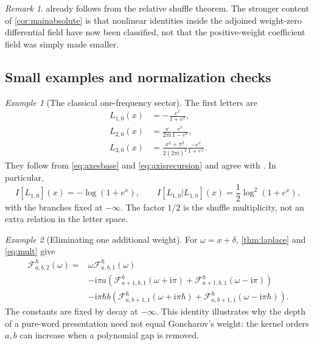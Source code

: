 \documentclass[11pt]{article}
\numberwithin{equation}{section}
\theoremstyle{definition}
\theoremstyle{remark}
\newtheorem{remark}[remark]{Remark}
\newtheorem{example}[example]{Example}
\newcommand{\ii}{\mathrm i}
\newcommand{\calF}{\mathcal F}
\newcommand{\qh}{\hbar}
\begin{document}
\begin{remark}
 already follows from the relative shuffle theorem.
The stronger content of \cref{cor:mainabsolute} is that nonlinear identities
inside the adjoined weight-zero differential field have now been classified,
not that the positive-weight coefficient field was simply made smaller.
\end{remark}

\subsection{Small examples and normalization checks}

\begin{example}[The classical one-frequency sector]
The first letters are
\begin{equation}\label{eq:classicalexamples}
 \begin{split}
 L_{1,0}(x)&=-\frac{e^x}{1+e^x},\\
 L_{2,0}(x)&=\frac{x}{2\pi\ii}\frac{e^x}{1-e^x},\\
 L_{3,0}(x)&=\frac{x^2+\pi^2}{2(2\pi\ii)^2}
               \frac{-e^x}{1+e^x}.
 \end{split}
\end{equation}
They follow from \eqref{eq:axesbase} and \eqref{eq:axisrecursion} and agree
with \cite[Lemma~5.4]{Goncharov2026}. In particular,
\[
 I[L_{1,0}](x)=-\log(1+e^x),\qquad
 I[L_{1,0}|L_{1,0}](x)=\frac12\log^2(1+e^x),
\]
with the branches fixed at $-\infty$. The factor $1/2$ is the shuffle
multiplicity, not an extra relation in the letter space.
\end{example}

\begin{example}[Eliminating one additional weight]
For $\omega=x+\delta$, \cref{thm:laplace} and \eqref{eq:mult} give
\begin{equation}\label{eq:weighttwo}
 \begin{split}
 \calF_{a,b,2}^{\qh}(\omega)
 ={}&\omega\calF_{a,b,1}^{\qh}(\omega)\\
 &-\ii\pi a\left(
 \calF_{a+1,b,1}^{\qh}(\omega+\ii\pi)
 +\calF_{a+1,b,1}^{\qh}(\omega-\ii\pi)\right)\\
 &-\ii\pi\qh b\left(
 \calF_{a,b+1,1}^{\qh}(\omega+\ii\pi\qh)
 +\calF_{a,b+1,1}^{\qh}(\omega-\ii\pi\qh)\right).
 \end{split}
\end{equation}
The constants are fixed by decay at $-\infty$. This identity illustrates
why the depth of a pure-word presentation need not equal Goncharov's
weight: the kernel orders $a,b$ can increase when a polynomial gap is
removed.
\end{example}
\end{document}
